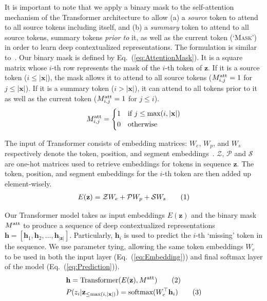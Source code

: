 \documentclass[letterpaper]{article} %
\newcommand\numberthis{\addtocounter{equation}{1}\tag{\theequation}}
\begin{document}
It is important to note that we apply a binary mask to the self-attention mechanism of the Transformer architecture to allow 
(a) a \emph{source} token to attend to all source tokens including itself, and 
(b) a \emph{summary} token to attend to all source tokens, summary tokens \emph{prior to} it, as well as the current token (`\textsc{Mask}') in order to learn deep contextualized representations.
The formulation is similar to~\cite{Dong:2019}.
Our binary mask is defined by Eq.~(\ref{eq:AttentionMask}).
It is a square matrix whose $i$-th row represents the mask of the $i$-th token of $\mathbf{z}$.
If it is a source token ($i \leq |\mathbf{x}|$), the mask allows it to attend to all source tokens ($M_{i,j}^{\mbox{\scriptsize att}} = 1$ for $j \leq |\mathbf{x}|$).
If it is a summary token ($i > |\mathbf{x}|$), it can attend to all tokens prior to it as well as the current token ($M_{i,j}^{\mbox{\scriptsize att}} = 1$ for $j \leq i$).
\begin{equation} \label{eq:AttentionMask}
M_{i,j}^{\mbox{\scriptsize att}} = \left\{
\begin{split}
&1 \quad \text{if} \ j \leq \max(i, |\mathbf{x}|)\\
&0 \quad \text{otherwise}
\end{split}
\right.
\end{equation}

The input of Transformer consists of embedding matrices: $W_e$, $W_p$, and $W_s$ respectively denote the token, position, and segment embeddings~\cite{Devlin:2018}.
$\mathcal{Z}$, $\mathcal{P}$ and $\mathcal{S}$ are one-hot matrices used to retrieve embeddings for tokens in sequence $\mathbf{z}$.
The token, position, and segment embeddings for the $i$-th token are then added up element-wisely. 
\begin{align*}
E(\mathbf{z}) = \mathcal{Z}W_e + \mathcal{P}W_p + \mathcal{S}W_s
\numberthis\label{eq:Embedding}
\end{align*}

Our Transformer model takes as input embeddings $E(\mathbf{z})$ and the binary mask $M^{\mbox{\scriptsize att}}$ to produce a sequence of deep contextualized representations $\mathbf{h}=[\mathbf{h}_1, \mathbf{h}_2, \dots, \mathbf{h}_{|\mathbf{z}|}]$. 
Particularly, $\mathbf{h}_i$ is used to predict the $i$-th `missing' token in the sequence. 
We use parameter tying, allowing the same token embeddings $W_e$ to be used in both the input layer (Eq.~(\ref{eq:Embedding})) and final softmax layer of the model (Eq.~(\ref{eq:Prediction})).
\begin{align*}
& \mathbf{h} = \text{Transformer}(E(\mathbf{z}), M^{\mbox{\scriptsize att}})
\numberthis\label{eq:Transformer}\\
& P(z_i|\mathbf{z}_{\leq \max(i,|\mathbf{x}|)}) = \mbox{softmax}(W_e^\top \mathbf{h}_i)
\numberthis\label{eq:Prediction}
\end{align*}
\end{document}
